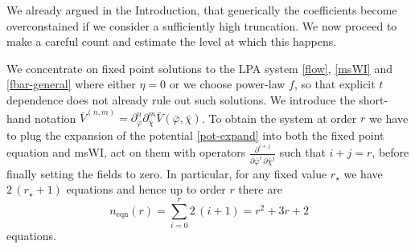 \documentclass[11pt]{book} %
\newcommand{\bp}{\bar \varphi}
\newcommand{\bc}{\bar \chi}
\begin{document}

We already argued in the Introduction, that generically the coefficients become overconstained if we consider a sufficiently high truncation. We now proceed to make a careful count and estimate the level at which this happens.




We concentrate on fixed point solutions to the LPA system \eqref{flow}, \eqref{msWI} and \eqref{fbar-general} where either $\eta=0$ or we choose power-law $f$, so that explicit $t$ dependence does not already rule out such solutions. We introduce the short-hand notation $\bar V ^{(n,m)}=\partial_{\bar \varphi}^n \partial_{\bar \chi}^m \bar V(\bp,\bc)$.
To obtain the system at order $r$ we have to plug the expansion of the potential \eqref{pot-expand}
into both the fixed point equation and msWI, act on them with operators $\frac{\partial^{i+j}}{\partial \bar\varphi^i \, \partial \bar\chi^j}$ such that $i+j=r$, before finally setting the fields to zero. In particular, for any fixed value $r_{\star}$ we have $2 \, (r_{\star}+1)$ equations
and hence up to order $r$ there are
\begin{equation}
\label{number_eqns}
n_{\text{eqn}}(r) = \sum_{i=0}^{r} 2\,(i+1) = r^2 + 3r + 2
\end{equation}
equations.
\end{document}
